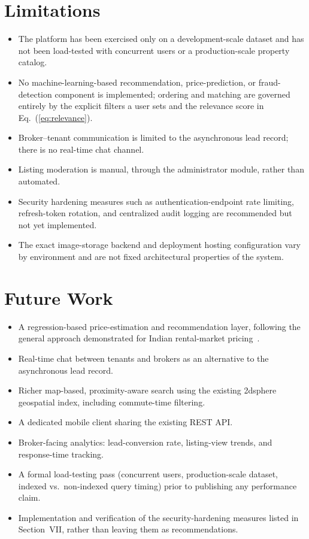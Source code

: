 \documentclass[10pt,twocolumn]{article}
\begin{document}
\section{Limitations}
\begin{itemize}
\item The platform has been exercised only on a development-scale dataset and has not been load-tested with concurrent users or a production-scale property catalog.
\item No machine-learning-based recommendation, price-prediction, or fraud-detection component is implemented; ordering and matching are governed entirely by the explicit filters a user sets and the relevance score in Eq.~(\ref{eq:relevance}).
\item Broker--tenant communication is limited to the asynchronous lead record; there is no real-time chat channel.
\item Listing moderation is manual, through the administrator module, rather than automated.
\item Security hardening measures such as authentication-endpoint rate limiting, refresh-token rotation, and centralized audit logging are recommended but not yet implemented.
\item The exact image-storage backend and deployment hosting configuration vary by environment and are not fixed architectural properties of the system.
\end{itemize}

\section{Future Work}
\begin{itemize}
\item A regression-based price-estimation and recommendation layer, following the general approach demonstrated for Indian rental-market pricing~\cite{putatunda2019}.
\item Real-time chat between tenants and brokers as an alternative to the asynchronous lead record.
\item Richer map-based, proximity-aware search using the existing 2dsphere geospatial index, including commute-time filtering.
\item A dedicated mobile client sharing the existing REST API.
\item Broker-facing analytics: lead-conversion rate, listing-view trends, and response-time tracking.
\item A formal load-testing pass (concurrent users, production-scale dataset, indexed vs.\ non-indexed query timing) prior to publishing any performance claim.
\item Implementation and verification of the security-hardening measures listed in Section~VII, rather than leaving them as recommendations.
\end{itemize}
\end{document}
